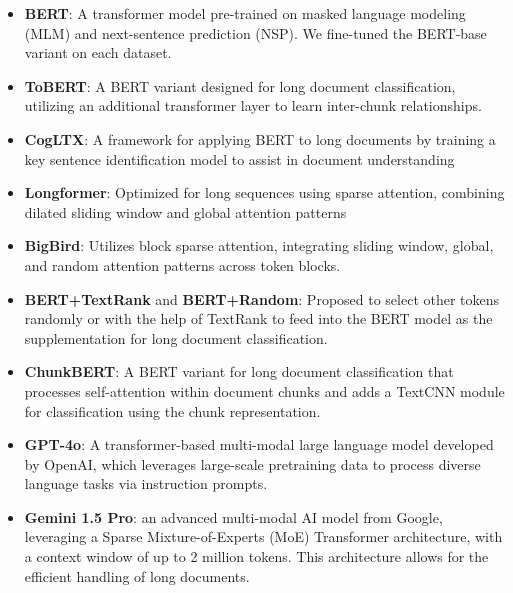 \documentclass[11pt]{article}
\begin{document}
\begin{itemize}
 \item\textbf{BERT}: A transformer model pre-trained on masked language modeling (MLM) and next-sentence prediction (NSP). We fine-tuned the BERT-base variant on each dataset. 

 \item\textbf{ToBERT}: A BERT variant designed for long document classification, utilizing an additional transformer layer to learn inter-chunk relationships.

 \item\textbf{CogLTX}: A framework for applying BERT to long documents by training a key sentence identification model to assist in document understanding

 \item\textbf{Longformer}: Optimized for long sequences using sparse attention, combining dilated sliding window and global attention patterns

 \item\textbf{BigBird}: Utilizes block sparse attention, integrating sliding window, global, and random attention patterns across token blocks.

 \item\textbf{BERT+TextRank} and \textbf{BERT+Random}: Proposed to select other tokens randomly or with the help of TextRank\citep{mihalcea2004textrank} to feed into the BERT model as the supplementation for long document classification.
    

 \item\textbf{ChunkBERT}: A BERT variant for long document classification that processes self-attention within document chunks and adds a TextCNN module for classification using the chunk representation.

 \item\textbf{GPT-4o}: A transformer-based multi-modal large language model developed by OpenAI, which leverages large-scale pretraining data to process diverse language tasks via instruction prompts.


 \item \textbf{Gemini 1.5 Pro}: an advanced multi-modal AI model from Google, leveraging a Sparse Mixture-of-Experts (MoE) Transformer architecture, with a context window of up to 2 million tokens. This architecture allows for the efficient handling of long documents.
 
\end{itemize}
\end{document}
